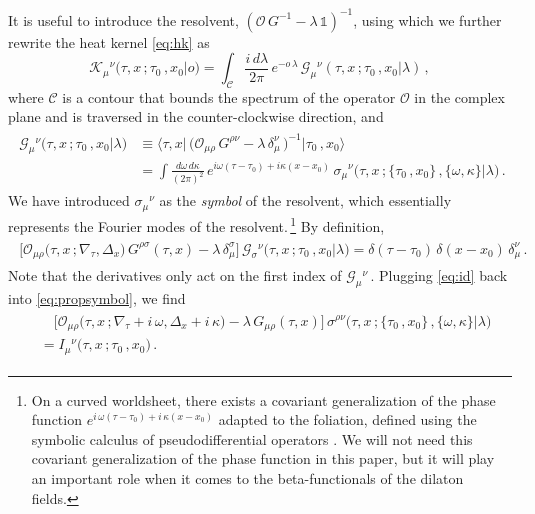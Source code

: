 \documentclass[11pt]{article}
\newcommand{\be}{\begin{equation}}
\newcommand{\ee}{\end{equation}}
\newcommand{\CC}{\mathcal{C}}
\newcommand{\CG}{\mathcal{G}}
\newcommand{\CK}{\mathcal{K}}
\newcommand{\CO}{\mathcal{O}}
\begin{document}
It is useful to introduce the resolvent, 
$( \CO \, G^{-1} - \lambda \, \mathbb{1} )^{-1}$, 
%
using which we further rewrite the heat kernel \eqref{eq:hk} as
%
\be \label{eq:odk}
	\CK_{\mu}{}^{\nu} \bigl(\tau, x\,; \tau_0\,, x_0 \big| o\bigr) = \int_\CC \frac{i \, d\lambda}{2\pi} \, e^{-o \, \lambda} \, \CG_{\mu}{}^{\nu} (\tau, x\,; \tau_0\,, x_0 | \lambda)\,,
\ee
%
where $\CC$ is a contour that bounds the spectrum of the operator $\CO$ in the complex plane and is traversed in the counter-clockwise direction, and
%
\begin{align} \label{eq:propsymbol}
\begin{split}
	\CG_{\mu}{}^{\nu} \bigl(\tau, x\,; \tau_0\,, x_0 \big| \lambda \bigr) & \equiv \bigl\langle \tau, x \big| \, \bigl( \CO_{\mu\rho} \, G^{\rho\nu} - \lambda \, \delta_{\mu}^{\nu} \, \bigr)^{-1} \big| \tau_0\,, x_0 \bigr\rangle \\[2pt]
	& = \int \frac{d\omega \, d\kappa}{(2\pi)^2} \, e^{i \omega ( \tau - \tau_0 ) + i \kappa ( x - x_0 )} \, \sigma_{\mu}{}^{\nu} \bigl(\tau, x\,; \{ \tau_0\,, x_0 \}\,, \{\omega, \kappa\} | \lambda\bigr)\,.
\end{split}
\end{align}
%
We have introduced $\sigma_{\mu}{}^{\nu}$ as the \emph{symbol} of the resolvent, which essentially represents the Fourier modes of the resolvent.\,\footnote{On a curved worldsheet, there exists a covariant generalization of the phase function $e^{i \, \omega ( \tau - \tau_0 ) + i \, \kappa ( x - x_0 )}$ adapted to the foliation, defined using the symbolic calculus of pseudodifferential operators \cite{Grosvenor:2021zvq, Gusynin:1989ky, widom1980complete}. We will not need this covariant generalization of the phase function in this paper, but it will play an important role when it comes to the beta-functionals of the dilaton fields.} By definition,
%
\begin{align} \label{eq:id}
\begin{split}
	\bigl[ \CO_{\mu\rho} \bigl( \tau, x\,; \nabla_{\!\tau}, \Delta_x \bigr) \, G^{\rho\sigma} (\tau, x) - \lambda \, \delta_\mu^\sigma \bigr] \, \CG_\sigma{}^\nu \bigl(\tau, x\,; \tau_0\,, x_0 \big| \lambda \bigr) 
	= \delta(\tau - \tau_0) \, \delta (x - x_0) \, \delta_\mu^\nu\,.
\end{split}
\end{align}
%
Note that the derivatives only act on the first index of $\CG_\mu{}^\nu$\,. Plugging \eqref{eq:id} back into \eqref{eq:propsymbol}, we find
%
\begin{align} \label{eq:sigmaeq}
\begin{split}
	& \quad \bigl[ \CO_{\mu\rho} \bigl( \tau, x\,; \nabla_{\!\tau} + i \, \omega, \Delta_x + i \, \kappa \bigr) - \lambda \, G_{\mu\rho} (\tau, x) \bigr] \, \sigma^{\rho\nu} \bigl(\tau, x\,; \{ \tau_0\,, x_0 \}\,, \{\omega, \kappa\} | \lambda\bigr) \\[2pt]
	& = I_\mu{}^\nu \bigl( \tau, x\,; \tau_0\,, x_0 \bigr)\,.
\end{split}
\end{align}
\end{document}
